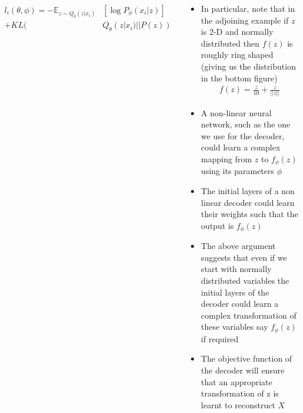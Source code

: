 \begin{frame}
\begin{columns}
\begin{overlayarea}{\textwidth}{\textheight}
			\vspace{-0.6cm}
			\begin{align*}
				l_i(\theta,\phi)=-\mathbb{E}_{z \sim Q_{\theta}(z|x_i)}& [\log P_{\phi}(x_i|z)] \\
				+ KL(&Q_{\theta}(z|x_i)||P(z))
			\end{align*}
		\end{overlayarea}
		\begin{overlayarea}{\textwidth}{\textheight}
			\footnotesize{\begin{itemize}\justifying
				\item<1-> In particular, note that in the adjoining example if $z$ is 2-D and normally distributed then $f(z)$ is roughly ring shaped (giving us the distribution in the bottom figure)
				\vspace{-4mm}
				\begin{align*}
				f(z) = \frac{z}{10} + \frac{z}{||z||}
				\end{align*}
				\vspace{-6mm}
				\item<2-> A non-linear neural network, such as the one we use for the decoder, could learn a complex mapping from $z$ to $f_\phi(z)$ using its parameters $\phi$
				\item<3-> The initial layers of a non linear decoder could learn their weights such that the output is $f_\phi(z)$
				\item<4-> The above argument suggests that even if we start with normally distributed variables the initial layers of the decoder could learn a complex transformation of these variables say $f_\phi(z)$ if required
				\item<5-> The objective function of the decoder will ensure that an appropriate transformation of z is learnt to reconstruct $X$
			\end{itemize}}
		\end{overlayarea}
	\end{columns}
\end{frame}


